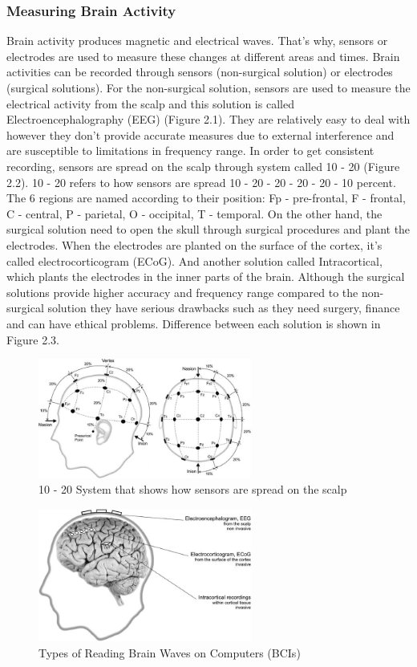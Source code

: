 \subsubsection{Measuring Brain Activity}
Brain activity produces magnetic and electrical waves. That’s why, sensors or electrodes are used to measure these changes at different areas and times. Brain activities can be recorded through sensors (non-surgical solution) or electrodes (surgical solutions). For the non-surgical solution, sensors are used to measure the electrical activity from the scalp and this solution is called Electroencephalography (EEG) (Figure 2.1). They are relatively easy to deal with however they don’t provide accurate measures due to external interference and are susceptible to limitations in frequency range. In order to get consistent recording, sensors are spread on the scalp through system called 10 - 20 (Figure 2.2). 10 - 20 refers to how sensors are spread 10 - 20 - 20 - 20 - 20 - 10 percent. The 6 regions are named according to their position: Fp - pre-frontal, F - frontal, C - central, P - parietal, O - occipital, T - temporal. On the other hand, the surgical solution need to open the skull through surgical procedures and plant the electrodes. When the electrodes are planted on the surface of the cortex, it’s called electrocorticogram (ECoG). And another solution called Intracortical, which plants the electrodes in the inner parts of the brain. Although the surgical solutions provide higher accuracy and frequency range compared to the non-surgical solution they have serious drawbacks such as they need surgery, finance and can have ethical problems. Difference between each solution is shown in Figure 2.3.
\begin{figure}
    \centering
    \includegraphics[width=70mm]{images/figure-2-2.jpg}
    \caption{10 - 20 System that shows how sensors are spread on the scalp}
    \label{fig:my_label}
\end{figure}
\begin{figure}
    \centering
    \includegraphics[width=70mm]{images/figure-2-3.jpg}
    \caption{Types of Reading Brain Waves on Computers (BCIs)}
    \label{fig:my_label}
\end{figure}

